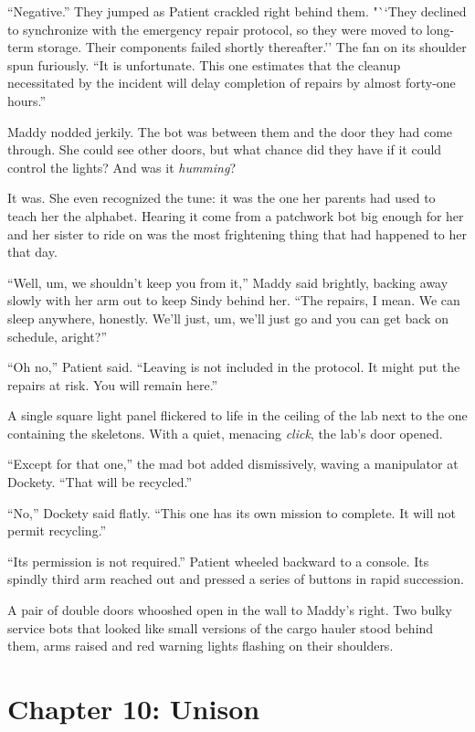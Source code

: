 \documentclass[10pt]{article}
\begin{document}
``Negative.'' They jumped as Patient crackled right behind them. "``They
declined to synchronize with the emergency repair protocol, so they were
moved to long-term storage. Their components failed shortly
thereafter.'' The fan on its shoulder spun furiously. ``It is
unfortunate. This one estimates that the cleanup necessitated by the
incident will delay completion of repairs by almost forty-one hours.''

Maddy nodded jerkily. The bot was between them and the door they had
come through. She could see other doors, but what chance did they have
if it could control the lights? And was it \emph{humming}?

It was. She even recognized the tune: it was the one her parents had
used to teach her the alphabet. Hearing it come from a patchwork bot big
enough for her and her sister to ride on was the most frightening thing
that had happened to her that day.

``Well, um, we shouldn't keep you from it,'' Maddy said brightly,
backing away slowly with her arm out to keep Sindy behind her. ``The
repairs, I mean. We can sleep anywhere, honestly. We'll just, um, we'll
just go and you can get back on schedule, aright?''

``Oh no,'' Patient said. ``Leaving is not included in the protocol. It
might put the repairs at risk. You will remain here.''

A single square light panel flickered to life in the ceiling of the lab
next to the one containing the skeletons. With a quiet, menacing
\emph{click}, the lab's door opened.

``Except for that one,'' the mad bot added dismissively, waving a
manipulator at Dockety. ``That will be recycled.''

``No,'' Dockety said flatly. ``This one has its own mission to complete.
It will not permit recycling.''

``Its permission is not required.'' Patient wheeled backward to a
console. Its spindly third arm reached out and pressed a series of
buttons in rapid succession.

A pair of double doors whooshed open in the wall to Maddy's right. Two
bulky service bots that looked like small versions of the cargo hauler
stood behind them, arms raised and red warning lights flashing on their
shoulders.

\newpage
\section{Chapter 10: Unison}
\end{document}
